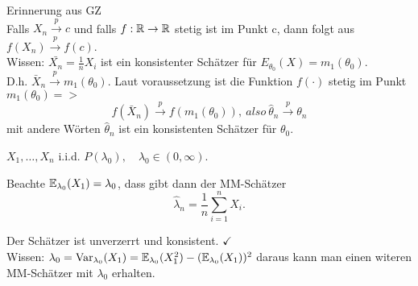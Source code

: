 \documentclass{tstextbook}
\begin{document}
\begin{remark}
	 Erinnerung aus GZ \\
	 Falls $ X_n \overset{p}{\rightarrow} c $ und falls $ f: \mathbb R \rightarrow \mathbb R $ stetig ist im Punkt c, dann folgt aus $ f(X_n) \overset{p}{\rightarrow} f(c)$. \\
	 Wissen: $ \bar{X_n} = \frac{1}{n} X_i $ ist ein konsistenter Schätzer für $ E_{\theta_0} (X) = m_1 (\theta_0)$. \\
	 D.h. $ \bar{X}_n \overset{p}{\rightarrow} m_1 (\theta_0) $. Laut voraussetzung ist die Funktion $f(\cdot)$ stetig im Punkt $ m_1(\theta_0) =>$ \[  f (\bar{X}_n) \overset{p}{\rightarrow} f(m_1 (\theta_0) ) ,\ also \ \hat{\theta}_n \overset{p}{\rightarrow}  \theta_n \] 
	 mit andere Wörten $\hat{\theta}_n$ ist ein konsistenten Schätzer für $ \theta_0 $.
\end{remark}



\begin{example}[Poissonverteilung]
	
	
	$ X_1, \ldots, X_n $ i.i.d. $ P(\lambda_0), \quad \lambda_0 \in (0, \infty) $. 
	
	Beachte $ \mathbb E_{\lambda_0}(X_1) = \lambda_0 $, dass gibt dann der MM-Schätzer \[ \hat{\lambda}_n = \frac{1}{n} \sum_{i=1}^{n} X_i. \] 	
	
	Der Schätzer ist unverzerrt und konsistent. $ \checkmark $ \\
	
	Wissen: $ \lambda_0 = \operatorname{Var}_{\lambda_0} (X_1) = \mathbb E_{\lambda_0} (X_1^2) - (\mathbb E_{\lambda_0} (X_1))^2 $
	daraus kann man einen witeren MM-Schätzer mit $ \lambda_0 $ erhalten. 
	
	
\end{example}
\end{document}
